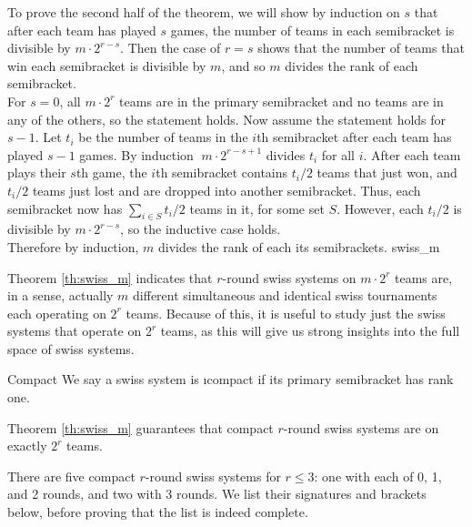 {{        To prove the second half of the theorem, we will show by induction on $s$ that after each team has played $s$ games, the number of teams in each semibracket is divisible by $m \cdot 2^{r - s}.$ Then the case of $r = s$ shows that the number of teams that win each semibracket is divisible by $m$, and so $m$ divides the rank of each semibracket.\\

        For $s = 0$, all $m \cdot 2^r$ teams are in the primary semibracket and no teams are in any of the others, so the statement holds. Now assume the statement holds for $s - 1$. Let $t_i$ be the number of teams in the $i$th semibracket after each team has played $s -1$ games. By induction $\; m \cdot 2^{r - s + 1}$ divides $t_i$ for all $i$. After each team plays their $s$th game, the $i$th semibracket contains $t_i/2$ teams that just won, and $t_i/2$ teams just lost and are dropped into another semibracket. Thus, each semibracket now has $\sum_{i \in S} t_i / 2$ teams in it, for some set $S.$ However, each $t_i / 2$ is divisible by $m \cdot 2^{r - s}$, so the inductive case holds.\\
        
        Therefore by induction, $m$ divides the rank of each its semibrackets.
    }{swiss_m}

    Theorem \ref{th:swiss_m} indicates that $r$-round swiss systems on $m \cdot 2^r$ teams are, in a sense, actually $m$ different simultaneous and identical swiss tournaments each operating on $2^r$ teams. Because of this, it is useful to study just the swiss systems that operate on $2^r$ teams, as this will give us strong insights into the full space of swiss systems.

    \begin{definition}{Compact}{}
        We say a swiss system is \i{compact} if its primary semibracket has rank one.
    \end{definition}

    Theorem \ref{th:swiss_m} guarantees that compact $r$-round swiss systems are on exactly $2^r$ teams.


    There are five compact $r$-round swiss systems for $r \leq 3$: one with each of 0, 1, and 2 rounds, and two with 3 rounds. We list their signatures and brackets below, before proving that the list is indeed complete.

}
